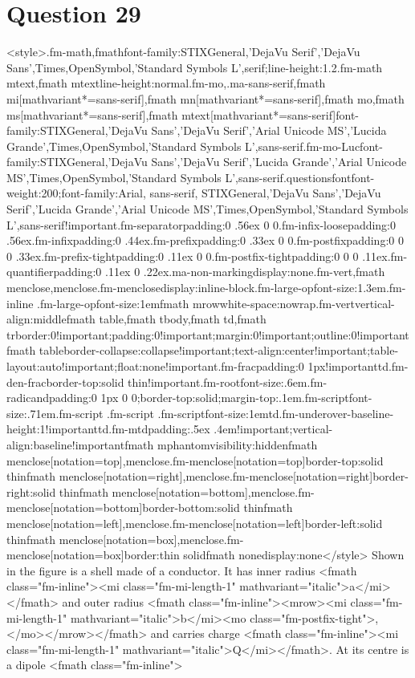 \documentclass{article}
\begin{document}
\section*{Question 29}
<style>.fm-math,fmath{font-family:STIXGeneral,'DejaVu Serif','DejaVu Sans',Times,OpenSymbol,'Standard Symbols L',serif;line-height:1.2}.fm-math mtext,fmath mtext{line-height:normal}.fm-mo,.ma-sans-serif,fmath mi[mathvariant*=sans-serif],fmath mn[mathvariant*=sans-serif],fmath mo,fmath ms[mathvariant*=sans-serif],fmath mtext[mathvariant*=sans-serif]{font-family:STIXGeneral,'DejaVu Sans','DejaVu Serif','Arial Unicode MS','Lucida Grande',Times,OpenSymbol,'Standard Symbols L',sans-serif}.fm-mo-Luc{font-family:STIXGeneral,'DejaVu Sans','DejaVu Serif','Lucida Grande','Arial Unicode MS',Times,OpenSymbol,'Standard Symbols L',sans-serif}.questionsfont{font-weight:200;font-family:Arial, sans-serif, STIXGeneral,'DejaVu Sans','DejaVu Serif','Lucida Grande','Arial Unicode MS',Times,OpenSymbol,'Standard Symbols L',sans-serif!important}.fm-separator{padding:0 .56ex 0 0}.fm-infix-loose{padding:0 .56ex}.fm-infix{padding:0 .44ex}.fm-prefix{padding:0 .33ex 0 0}.fm-postfix{padding:0 0 0 .33ex}.fm-prefix-tight{padding:0 .11ex 0 0}.fm-postfix-tight{padding:0 0 0 .11ex}.fm-quantifier{padding:0 .11ex 0 .22ex}.ma-non-marking{display:none}.fm-vert,fmath menclose,menclose.fm-menclose{display:inline-block}.fm-large-op{font-size:1.3em}.fm-inline .fm-large-op{font-size:1em}fmath mrow{white-space:nowrap}.fm-vert{vertical-align:middle}fmath table,fmath tbody,fmath td,fmath tr{border:0!important;padding:0!important;margin:0!important;outline:0!important}fmath table{border-collapse:collapse!important;text-align:center!important;table-layout:auto!important;float:none!important}.fm-frac{padding:0 1px!important}td.fm-den-frac{border-top:solid thin!important}.fm-root{font-size:.6em}.fm-radicand{padding:0 1px 0 0;border-top:solid;margin-top:.1em}.fm-script{font-size:.71em}.fm-script .fm-script .fm-script{font-size:1em}td.fm-underover-base{line-height:1!important}td.fm-mtd{padding:.5ex .4em!important;vertical-align:baseline!important}fmath mphantom{visibility:hidden}fmath menclose[notation=top],menclose.fm-menclose[notation=top]{border-top:solid thin}fmath menclose[notation=right],menclose.fm-menclose[notation=right]{border-right:solid thin}fmath menclose[notation=bottom],menclose.fm-menclose[notation=bottom]{border-bottom:solid thin}fmath menclose[notation=left],menclose.fm-menclose[notation=left]{border-left:solid thin}fmath menclose[notation=box],menclose.fm-menclose[notation=box]{border:thin solid}fmath none{display:none}</style> Shown in the figure is a shell made of a conductor. It has inner radius <fmath class="fm-inline"><mi class="fm-mi-length-1" mathvariant="italic">a</mi></fmath> and outer radius <fmath class="fm-inline"><mrow><mi class="fm-mi-length-1" mathvariant="italic">b</mi><mo class="fm-postfix-tight">,</mo></mrow></fmath> and carries charge <fmath class="fm-inline"><mi class="fm-mi-length-1" mathvariant="italic">Q</mi></fmath>. At its centre is a dipole <fmath class="fm-inline">\begin{tabular}{|c|c|}

\end{tabular}
\end{document}
